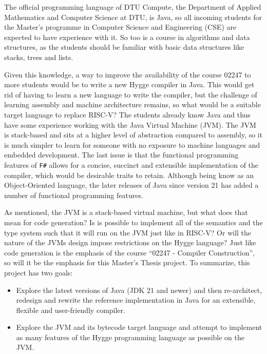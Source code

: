 The official programming language of DTU Compute, the Department of Applied Mathematics and Computer Science at DTU, is Java, so
all incoming students for the Master's programme in Computer Science and Engineering (CSE) are expected to have experience with it.
So too is a course in algorithms and data structures, as the students should be familiar with basic data structures like stacks, trees and lists.

Given this knowledge, a way to improve the availability of the course 02247 to more students would be to write a new Hygge compiler in Java. 
This would get rid of having to learn a new language to write the compiler, but the challenge of learning assembly and machine architecture remains,
so what would be a suitable target language to replace RISC-V? The students already know Java and thus have some experience working with 
the Java Virtual Machine (JVM). The JVM is stack-based and sits at a higher level of abstraction compared to assembly, so it is much simpler 
to learn for someone with no exposure to machine languages and embedded development. The last issue is that the functional programming features
of \texttt{F\#} allows for a concise, succinct and extensible implementation of the compiler, which would be desirable traits to retain. 
Although being know as an Object-Oriented language, the later releases of Java since version 21 has added a number of functional programming features.

As mentioned, the JVM is a stack-based virtual machine, but what does that mean for code generation? Is is possible to implement all of the semantics
and the type system such that it will run on the JVM just like in RISC-V? Or will the nature of the JVMs design impose restrictions on the Hygge language?
Just like code generation is the emphasis of the course ``02247 - Compiler Construction'', so will it be the emphasis for this Master's Thesis project.
To summarize, this project has two goals:

\begin{itemize}
    \item Explore the latest versions of Java (JDK 21 and newer) and then re-architect, redesign and rewrite the reference implementation in Java for an extensible, flexible and user-friendly compiler.
    \item Explore the JVM and its bytecode target language and attempt to implement as many features of the Hygge programming language as possible on the JVM.
\end{itemize}

